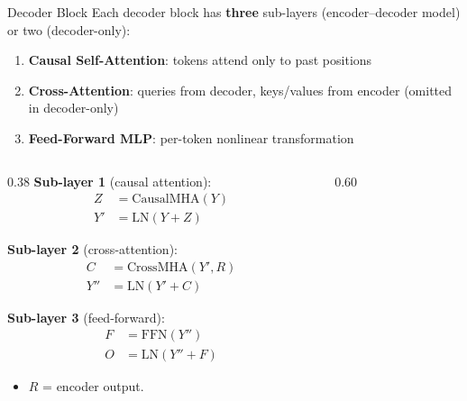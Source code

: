 \begin{frame}{Decoder Block}
  Each decoder block has \textbf{three} sub-layers (encoder--decoder model) or two (decoder-only):
  \begin{enumerate}
    \item \textbf{Causal Self-Attention}: tokens attend only to past positions
    \item \textbf{Cross-Attention}: queries from decoder, keys/values from encoder (omitted in decoder-only)
    \item \textbf{Feed-Forward MLP}: per-token nonlinear transformation
  \end{enumerate}

  \begin{columns}[T]
    \begin{column}{0.38\textwidth}
      \vspace{0.5em}
      \textbf{Sub-layer 1} (causal attention):
      \begin{align*}
        Z &= \mathrm{CausalMHA}(Y) \\
        Y' &= \mathrm{LN}(Y + Z)
      \end{align*}

      \textbf{Sub-layer 2} (cross-attention):
      \begin{align*}
        C &= \mathrm{CrossMHA}(Y', R) \\
        Y'' &= \mathrm{LN}(Y' + C)
      \end{align*}

      \textbf{Sub-layer 3} (feed-forward):
      \begin{align*}
        F &= \mathrm{FFN}(Y'') \\
        O &= \mathrm{LN}(Y'' + F)
      \end{align*}

      \begin{itemize}
        \item {\small $R$ = encoder output.}
      \end{itemize}
    \end{column}
    \begin{column}{0.60\textwidth}
      \begin{center}
\end{center}
\end{column}
\end{columns}
\end{frame}
